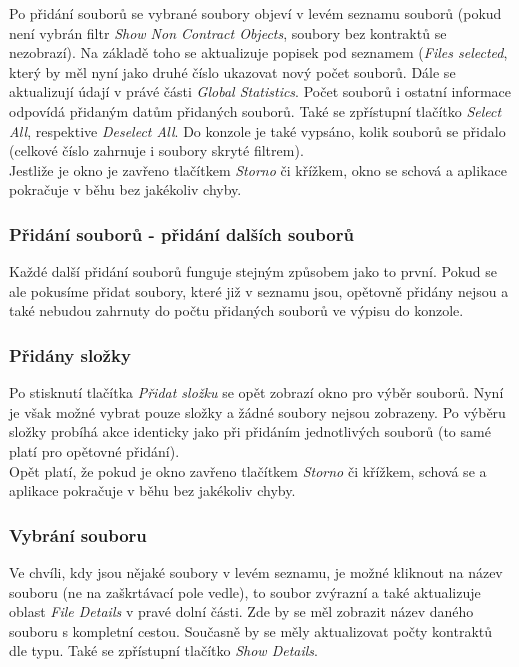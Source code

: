 				Po přidání souborů se vybrané soubory objeví v levém seznamu souborů (pokud není vybrán filtr \emph{Show Non Contract Objects}, soubory bez kontraktů se nezobrazí). Na základě toho se aktualizuje popisek pod seznamem (\emph{Files selected}, který by měl nyní jako druhé číslo ukazovat nový počet souborů. Dále se aktualizují údají v právé části \emph{Global Statistics}. Počet souborů i ostatní informace odpovídá přidaným datům přidaných souborů. Také se zpřístupní tlačítko \emph{Select All}, respektive \emph{Deselect All}. Do konzole je také vypsáno, kolik souborů se přidalo (celkové číslo zahrnuje i soubory skryté filtrem).\\
				
				Jestliže je okno je zavřeno tlačítkem \emph{Storno} či křížkem, okno se schová a aplikace pokračuje v běhu bez jakékoliv chyby. 
				
			\subsubsection{Přidání souborů - přidání dalších souborů}
				Každé další přidání souborů funguje stejným způsobem jako to první. Pokud se ale pokusíme přidat soubory, které již v seznamu jsou, opětovně přidány nejsou a také nebudou zahrnuty do počtu přidaných souborů ve výpisu do konzole.
				
			\subsubsection{Přidány složky}
				Po stisknutí tlačítka \emph{Přidat složku} se opět zobrazí okno pro výběr souborů. Nyní je však možné vybrat pouze složky a žádné soubory nejsou zobrazeny. Po výběru složky probíhá akce identicky jako při přidáním jednotlivých souborů (to samé platí pro opětovné přidání).\\
				
				Opět platí, že pokud je okno zavřeno tlačítkem \emph{Storno} či křížkem, schová se a aplikace pokračuje v běhu bez jakékoliv chyby. 
				
			\subsubsection{Vybrání souboru}
				Ve chvíli, kdy jsou nějaké soubory v levém seznamu, je možné kliknout na název souboru (ne na zaškrtávací pole vedle), to soubor zvýrazní a také aktualizuje oblast \emph{File Details} v pravé dolní části. Zde by se měl zobrazit název daného souboru s kompletní cestou. Současně by se měly aktualizovat počty kontraktů dle typu. Také se zpřístupní tlačítko \emph{Show Details}.
				
